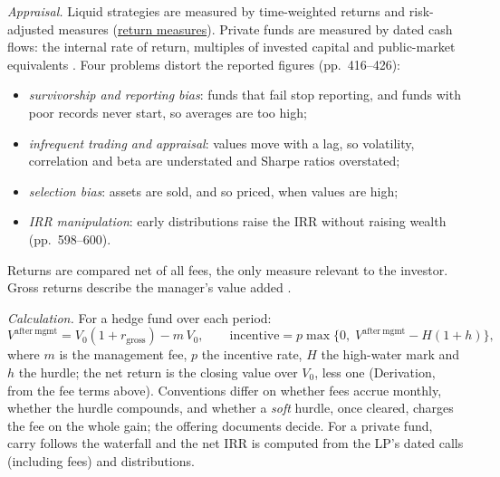 \begin{qfmethod}\label{meth:alternative-returns-after-fees}
 \emph{Appraisal.} Liquid strategies are measured by time-weighted returns and risk-adjusted measures (\hyperref[def:return-measures]{return measures}). Private funds are measured by dated cash flows: the internal rate of return, multiples of invested capital and public-market equivalents \citep[pp.~597--602]{s7-ang}. Four problems distort the reported figures (pp.~416--426):
\begin{itemize}
\item \emph{survivorship and reporting bias}: funds that fail stop reporting, and funds with poor records never start, so averages are too high;
\item \emph{infrequent trading and appraisal}: values move with a lag, so volatility, correlation and beta are understated and Sharpe ratios overstated;
\item \emph{selection bias}: assets are sold, and so priced, when values are high;
\item \emph{IRR manipulation}: early distributions raise the IRR without raising wealth (pp.~598--600).
\end{itemize}
Returns are compared net of all fees, the only measure relevant to the investor. Gross returns describe the manager's value added \citep[p.~67]{demaria-private-markets-2021}.

\emph{Calculation.} For a hedge fund over each period:
\[ V^{\mathrm{after\ mgmt}}=V_0(1+r_{\mathrm{gross}})-m\,V_0,\qquad \text{incentive}=p\max\{0,\;V^{\mathrm{after\ mgmt}}-H(1+h)\}, \]
where $m$ is the management fee, $p$ the incentive rate, $H$ the high-water mark and $h$ the hurdle; the net return is the closing value over $V_0$, less one (Derivation, from the fee terms above). Conventions differ on whether fees accrue monthly, whether the hurdle compounds, and whether a \emph{soft} hurdle, once cleared, charges the fee on the whole gain; the offering documents decide. For a private fund, carry follows the waterfall and the net IRR is computed from the LP's dated calls (including fees) and distributions.


\end{qfmethod}
